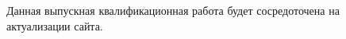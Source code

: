 \begin{comment}
    Cайт Учреждения уступает современным трендам по нескольким показателям:
    \begin{itemize}
        \item технический -- исполнение содержимого сайта является неактуальным с точки зрения используемых технологий;
        \item функциональный -- возможности, предоставляемые сайтом не соответствуют потребностям Учреждения;
        \item информационный -- часть информации является устаревшей и неактуальной, требует замены;
        \item визуальный -- внешнее оформление сайта не соответствует современным подходам к проектированию и оформлению web-ресурсов.
    \end{itemize}    
\end{comment}

Данная выпускная квалификационная работа будет сосредоточена на актуализации сайта.

\clearpage
